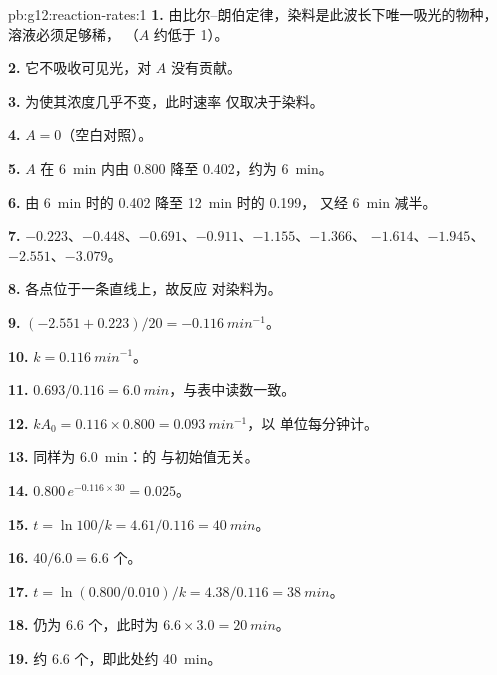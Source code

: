 \begin{solution}{pb:g12:reaction-rates:1}
\textbf{1.} 由比尔–朗伯定律，染料是此波长下唯一吸光的物种，
溶液必须足够稀，
（$A$ 约低于 1）。

\textbf{2.} 它不吸收可见光，对 $A$ 没有贡献。

\textbf{3.} 为使其浓度几乎不变，此时速率
仅取决于染料。

\textbf{4.} $A = 0$（空白对照）。

\textbf{5.} $A$ 在 \qty{6}{min} 内由 0.800 降至 0.402，约为
\qty{6}{min}。

\textbf{6.} 由 \qty{6}{min} 时的 0.402 降至 \qty{12}{min} 时的 0.199，
又经 \qty{6}{min} 减半。

\textbf{7.} $-0.223$、$-0.448$、$-0.691$、$-0.911$、$-1.155$、$-1.366$、
$-1.614$、$-1.945$、$-2.551$、$-3.079$。

\textbf{8.} 各点位于一条直线上，故反应
对染料为。

\textbf{9.} $(-2.551 + 0.223)/20 = \qty{-0.116}{min^{-1}}$。

\textbf{10.} $k = \qty{0.116}{min^{-1}}$。

\textbf{11.} $0.693 / 0.116 = \qty{6.0}{min}$，与表中读数一致。

\textbf{12.} $k A_0 = 0.116 \times 0.800 = \qty{0.093}{min^{-1}}$，以
单位每分钟计。

\textbf{13.} 同样为 \qty{6.0}{min}：的
与初始值无关。

\textbf{14.} $0.800\, e^{-0.116 \times 30} = 0.025$。

\textbf{15.} $t = \ln 100 / k = 4.61 / 0.116 = \qty{40}{min}$。

\textbf{16.} $40 / 6.0 = 6.6$ 个。

\textbf{17.} $t = \ln(0.800/0.010)/k = 4.38 / 0.116 = \qty{38}{min}$。

\textbf{18.} 仍为 6.6 个，此时为 $6.6 \times 3.0 = \qty{20}{min}$。

\textbf{19.} 约 6.6 个，即此处约 \qty{40}{min}。
\end{solution}
